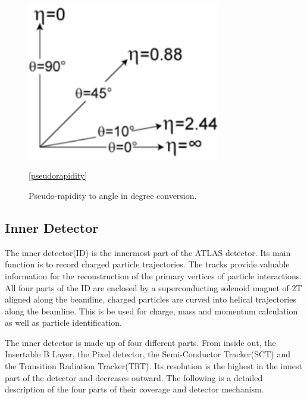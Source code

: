 \begin{figure}[!htb]
    \begin{center}
        \includegraphics[width=0.75\textwidth]{figures/chapter_ATLAS/pseudorapidity}
        \caption{
			Pseudo-rapidity \eta to angle in degree conversion. \cite{enwiki:1052183914} 
        }
        \label{fig:pseudorapidity}
        \ref{pseudorapidity}
    \end{center}
\end{figure}



\subsection{Inner Detector}
The inner detector(ID) is the innermost part of the ATLAS detector. Its main function is to record charged particle trajectories. The tracks provide valuable information for the reconstruction of the primary vertices of particle interactions. All four parts of the ID are enclosed by a superconducting solenoid magnet of 2T aligned along the beamline, charged particles are curved into helical trajectories along the beamline. This is be used for charge, mass and momentum calculation as well as particle
identification. 



The inner detector is made up of four different parts. From inside out, the Insertable B Layer, the Pixel detector, the Semi-Conductor Tracker(SCT) and the Transition Radiation Tracker(TRT). 
Its resolution is the highest in the innest part of the detector and decreases outward. The following is a detailed description of the four parts of their coverage and detector mechanism. 


